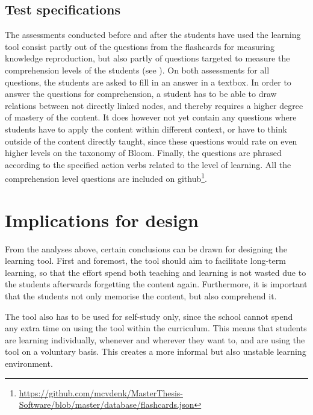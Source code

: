 
\subsection{Test specifications}

The assessments conducted before and after the students have used the learning tool consist partly out of the questions from the flashcards for measuring knowledge reproduction, but also partly of questions targeted to measure the comprehension levels of the students (see ). On both assessments for all questions, the students are asked to fill in an answer in a textbox. In order to answer the questions for comprehension, a student has to be able to draw relations between not directly linked nodes, and thereby requires a higher degree of mastery of the content. It does however not yet contain any questions where students have to apply the content within different context, or have to think outside of the content directly taught, since these questions would rate on even higher levels on the taxonomy of Bloom. Finally, the questions are phrased according to the specified action verbs related to the level of learning. All the comprehension level questions are included on github\footnote{\url{https://github.com/mcvdenk/MasterThesis-Software/blob/master/database/flashcards.json}}.

\section{Implications for design}

From the analyses above, certain conclusions can be drawn for designing the learning tool. First and foremost, the tool should aim to facilitate long-term learning, so that the effort spend both teaching and learning is not wasted due to the students afterwards forgetting the content again. Furthermore, it is important that the students not only memorise the content, but also comprehend it.

The tool also has to be used for self-study only, since the school cannot spend any extra time on using the tool within the curriculum. This means that students are learning individually, whenever and wherever they want to, and are using the tool on a voluntary basis. This creates a more informal but also unstable learning environment.

